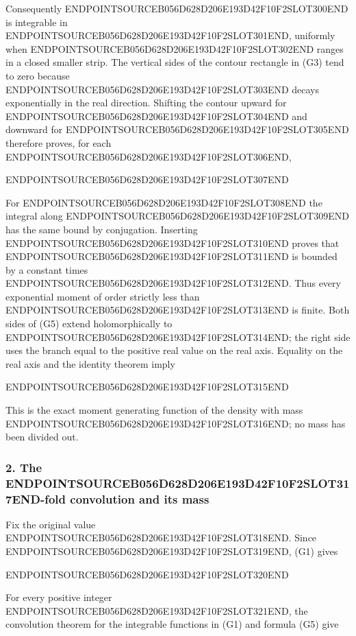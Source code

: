 Consequently ENDPOINTSOURCEB056D628D206E193D42F10F2SLOT300END is integrable in ENDPOINTSOURCEB056D628D206E193D42F10F2SLOT301END, uniformly when ENDPOINTSOURCEB056D628D206E193D42F10F2SLOT302END ranges in a closed smaller strip. The vertical sides of the contour rectangle in (G3) tend to zero because ENDPOINTSOURCEB056D628D206E193D42F10F2SLOT303END decays exponentially in the real direction. Shifting the contour upward for ENDPOINTSOURCEB056D628D206E193D42F10F2SLOT304END and downward for ENDPOINTSOURCEB056D628D206E193D42F10F2SLOT305END therefore proves, for each ENDPOINTSOURCEB056D628D206E193D42F10F2SLOT306END,

ENDPOINTSOURCEB056D628D206E193D42F10F2SLOT307END

For ENDPOINTSOURCEB056D628D206E193D42F10F2SLOT308END the integral along ENDPOINTSOURCEB056D628D206E193D42F10F2SLOT309END has the same bound by conjugation. Inserting ENDPOINTSOURCEB056D628D206E193D42F10F2SLOT310END proves that ENDPOINTSOURCEB056D628D206E193D42F10F2SLOT311END is bounded by a constant times ENDPOINTSOURCEB056D628D206E193D42F10F2SLOT312END. Thus every exponential moment of order strictly less than ENDPOINTSOURCEB056D628D206E193D42F10F2SLOT313END is finite. Both sides of (G5) extend holomorphically to ENDPOINTSOURCEB056D628D206E193D42F10F2SLOT314END; the right side uses the branch equal to the positive real value on the real axis. Equality on the real axis and the identity theorem imply

ENDPOINTSOURCEB056D628D206E193D42F10F2SLOT315END

This is the exact moment generating function of the density with mass ENDPOINTSOURCEB056D628D206E193D42F10F2SLOT316END; no mass has been divided out.

\subsubsection{\texorpdfstring{2. The ENDPOINTSOURCEB056D628D206E193D42F10F2SLOT317END-fold convolution and its mass}{2. The -fold convolution and its mass}}\label{endpoint-gamma_review--the-k-fold-convolution-and-its-mass}

Fix the original value ENDPOINTSOURCEB056D628D206E193D42F10F2SLOT318END. Since ENDPOINTSOURCEB056D628D206E193D42F10F2SLOT319END, (G1) gives

ENDPOINTSOURCEB056D628D206E193D42F10F2SLOT320END

For every positive integer ENDPOINTSOURCEB056D628D206E193D42F10F2SLOT321END, the convolution theorem for the integrable functions in (G1) and formula (G5) give

